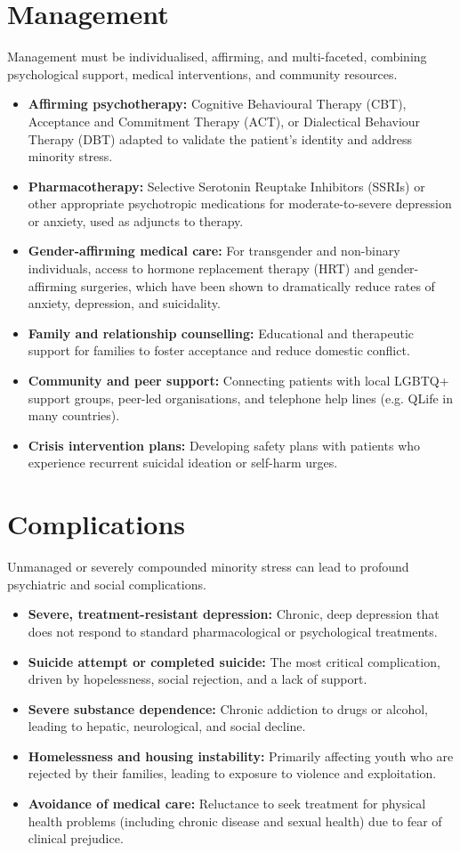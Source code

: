 \section*{Management}
Management must be individualised, affirming, and multi-faceted, combining psychological support, medical interventions, and community resources.
\begin{itemize}
    \item \textbf{Affirming psychotherapy:} Cognitive Behavioural Therapy (CBT), Acceptance and Commitment Therapy (ACT), or Dialectical Behaviour Therapy (DBT) adapted to validate the patient's identity and address minority stress.
    \item \textbf{Pharmacotherapy:} Selective Serotonin Reuptake Inhibitors (SSRIs) or other appropriate psychotropic medications for moderate-to-severe depression or anxiety, used as adjuncts to therapy.
    \item \textbf{Gender-affirming medical care:} For transgender and non-binary individuals, access to hormone replacement therapy (HRT) and gender-affirming surgeries, which have been shown to dramatically reduce rates of anxiety, depression, and suicidality.
    \item \textbf{Family and relationship counselling:} Educational and therapeutic support for families to foster acceptance and reduce domestic conflict.
    \item \textbf{Community and peer support:} Connecting patients with local LGBTQ+ support groups, peer-led organisations, and telephone help lines (e.g. QLife in many countries).
    \item \textbf{Crisis intervention plans:} Developing safety plans with patients who experience recurrent suicidal ideation or self-harm urges.
\end{itemize}

\section*{Complications}
Unmanaged or severely compounded minority stress can lead to profound psychiatric and social complications.
\begin{itemize}
    \item \textbf{Severe, treatment-resistant depression:} Chronic, deep depression that does not respond to standard pharmacological or psychological treatments.
    \item \textbf{Suicide attempt or completed suicide:} The most critical complication, driven by hopelessness, social rejection, and a lack of support.
    \item \textbf{Severe substance dependence:} Chronic addiction to drugs or alcohol, leading to hepatic, neurological, and social decline.
    \item \textbf{Homelessness and housing instability:} Primarily affecting youth who are rejected by their families, leading to exposure to violence and exploitation.
    \item \textbf{Avoidance of medical care:} Reluctance to seek treatment for physical health problems (including chronic disease and sexual health) due to fear of clinical prejudice.
\end{itemize}

